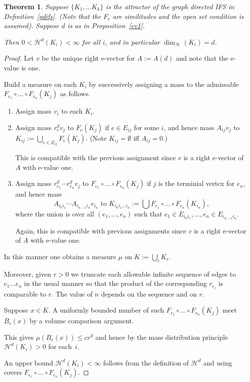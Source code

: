 \documentclass[a4paper]{amsart}
\theoremstyle{plain}
\newtheorem{theorem}{Theorem}[section]
\theoremstyle{definition}
\theoremstyle{remark}
\begin{document}
\begin{theorem} Suppose $\{ K_1,\dots K_k\} $ is the attractor of the graph directed IFS in Definition~\ref{gdifs}. (Note that the $ F_e $ are similitudes and the open set condition is assumed).  Suppose $ d $ is as in Proposition~\ref{ev1}. 


Then $ 0 <  \mathcal{H} ^d (K_i ) <\infty $ for all $ i $, and in particular $ \dim_{\mathcal{H}}(K_i ) = d $. 
\end{theorem}

\begin{proof}
Let $ v $ be the unique right e-vector for $ A:=A(d ) $ and note that the e-value is  one.  

Build a measure on   each $ K_i $ by successively assigning a mass to the admissable $  F_{e_1}\circ \dots \circ F_{e_n}(K_j)$ as follows.

\begin{enumerate}

\item Assign   mass $ v_i $ to each $ K_i $.

\item Assign   mass $ r_e^d  v_j $ to $ F_e(K_j) $ if $ e \in E_{ij} $ for some $ i $, and hence mass
$  A_{ij} v_j$ to $K_{ij} := \bigcup_{e\in E_{ij}} F_e(K_j) $.  (Note $  K_{ij} = \emptyset $ iff  $ A_{ij} = 0 $.)

This is compatible with the previous assignment since $ v $ is a right e-vector of $ A $ with e-value one.

\item Assign mass $ r_{e_1}^d  \cdots  r_{e_n}^d v_j $ to $ F_{e_1}\circ \dots \circ F_{e_n} (K_j) $ if $ j $ is the terminial vertex for $ e_n $, and hence mass
\[
A_{i_0i_1}\cdots A_{i_{n-1}i_n} v_{i_n} \text{ to } K_{i_0i_1\dots i_n} :=
  \bigcup F_{e_1}\circ \dots \circ F_{e_n} (K_{i_n}),
  \]
 where the union is over all $ (e_1,\dots, e_n) $ such that $ e_1 \in E_{i_0i_1}, \dots, e_n \in E_{i_{n-1}i_n} $. 

Again, this is compatible with previous assignments since $ v $ is a right e-vector of $ A $ with e-value one.
\end{enumerate} 

In this manner one obtains a measure $ \mu $ on $K := \bigcup_i K_i $.  

Moreover, given  $ r> 0 $ we truncate each allowable infinite sequence of edges to $ e_1 \dots e_n $  in the usual manner so that   the product of the  corresponding $ r_{e_i} $  is comparable to $ r $. The value   of $ n $ depends on the sequence and on $ r $. 

Suppose $ x \in K$. A uniformly bounded number of such $ F_{e_1}\circ \dots \circ F_{e_n} (K_j) $ meet $  B_r(x) $ by a volume comparison argument.  

This gives $ \mu (B_r(x) ) \leq cr^d $ and hence by the mass distribution principle $ \mathcal{H} ^d  (K_i) > 0 $ for each~$ i $.

An upper bound $   \mathcal{H} ^d  (K_i) < \infty  $ follows from the definition of $  \mathcal{H} ^d $ and using covers $ F_{e_1}\circ \dots \circ F_{e_n} (K_j) $.
\end{proof}  
\end{document}
